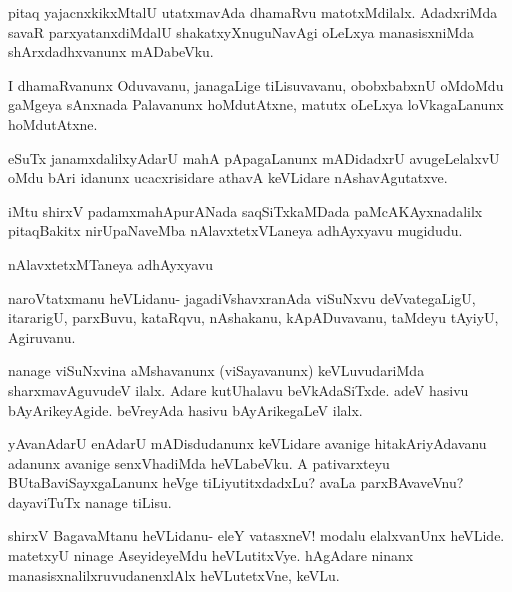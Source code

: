 \documentclass{article}
\begin{document}
\begin{mng}%
pitaq yajacnxkikxMtalU utatxmavAda dhamaRvu matotxMdilalx.
AdadxriMda savaR parxyatanxdiMdalU shakatxyXnuguNavAgi oLeLxya manasisxniMda
shArxdadhxvanunx mADabeVku.
\end{mng}

\begin{mng}%
I dhamaRvanunx Oduvavanu, janagaLige tiLisuvavanu, obobxbabxnU
oMdoMdu gaMgeya sAnxnada Palavanunx hoMdutAtxne, matutx oLeLxya
loVkagaLanunx hoMdutAtxne.
\end{mng}

\begin{mng}%
eSuTx janamxdalilxyAdarU mahA pApagaLanunx mADidadxrU
avugeLelalxvU oMdu bAri idanunx ucacxrisidare athavA keVLidare nAshavAgutatxve.
\end{mng}

\begin{center}
iMtu shirxV padamxmahApurANada saqSiTxkaMDada paMcAKAyxnadalilx pitaqBakitx
nirUpaNaveMba nAlavxtetxVLaneya adhAyxyavu mugidudu.
\end{center}

\newpage
\begin{center}
{\textbf\large{nAlavxtetxMTaneya adhAyxyavu}}
\end{center}


\begin{mng}%
naroVtatxmanu heVLidanu- jagadiVshavxranAda viSuNxvu deVvategaLigU,
itararigU, parxBuvu, kataRqvu, nAshakanu, kApADuvavanu, taMdeyu
tAyiyU, Agiruvanu.
\end{mng}

\begin{mng}%
nanage viSuNxvina aMshavanunx (viSayavanunx) keVLuvudariMda sharxmavAguvudeV ilalx.
Adare kutUhalavu beVkAdaSiTxde. adeV hasivu bAyArikeyAgide.
beVreyAda hasivu bAyArikegaLeV ilalx.
\end{mng}

\begin{mng}%
yAvanAdarU enAdarU mADisdudanunx keVLidare avanige hitakAriyAdavanu
adanunx avanige senxVhadiMda heVLabeVku. A pativarxteyu
BUtaBaviSayxgaLanunx heVge tiLiyutitxdadxLu? avaLa parxBAvaveVnu? dayaviTuTx nanage tiLisu.
\end{mng}

\begin{mng}%
shirxV BagavaMtanu heVLidanu- eleY vatasxneV! modalu elalxvanUnx
heVLide. matetxyU ninage AseyideyeMdu heVLutitxVye. hAgAdare ninanx
manasisxnalilxruvudanenxlAlx heVLutetxVne, keVLu.
\end{mng}
\end{document}
